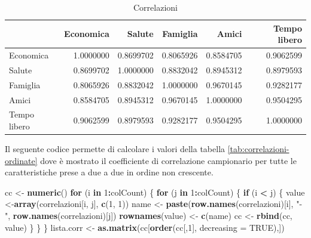 \documentclass[]{book}
\newenvironment{Shaded}{\begin{snugshade}}{\end{snugshade}}
\newcommand{\KeywordTok}[1]{\textcolor[rgb]{0.13,0.29,0.53}{\textbf{#1}}}
\newcommand{\DataTypeTok}[1]{\textcolor[rgb]{0.13,0.29,0.53}{#1}}
\newcommand{\DecValTok}[1]{\textcolor[rgb]{0.00,0.00,0.81}{#1}}
\newcommand{\StringTok}[1]{\textcolor[rgb]{0.31,0.60,0.02}{#1}}
\newcommand{\OtherTok}[1]{\textcolor[rgb]{0.56,0.35,0.01}{#1}}
\newcommand{\ControlFlowTok}[1]{\textcolor[rgb]{0.13,0.29,0.53}{\textbf{#1}}}
\newcommand{\OperatorTok}[1]{\textcolor[rgb]{0.81,0.36,0.00}{\textbf{#1}}}
\newcommand{\NormalTok}[1]{#1}
\begin{document}
\begin{table}

\caption{\label{tab:correlazioni}Correlazioni}
\centering
\begin{tabular}[t]{l|r|r|r|r|r}
\hline
  & Economica & Salute & Famiglia & Amici & Tempo libero\\
\hline
Economica & 1.0000000 & 0.8699702 & 0.8065926 & 0.8584705 & 0.9062599\\
\hline
Salute & 0.8699702 & 1.0000000 & 0.8832042 & 0.8945312 & 0.8979593\\
\hline
Famiglia & 0.8065926 & 0.8832042 & 1.0000000 & 0.9670145 & 0.9282177\\
\hline
Amici & 0.8584705 & 0.8945312 & 0.9670145 & 1.0000000 & 0.9504295\\
\hline
Tempo libero & 0.9062599 & 0.8979593 & 0.9282177 & 0.9504295 & 1.0000000\\
\hline
\end{tabular}
\end{table}

Il seguente codice permette di calcolare i valori della tabella
\ref{tab:correlazioni-ordinate} dove è mostrato il coefficiente di
correlazione campionario per tutte le caratteristiche prese a due a due
in ordine non crescente.

\begin{Shaded}
\begin{Highlighting}[]
\NormalTok{cc <-}\StringTok{ }\KeywordTok{numeric}\NormalTok{()}
\ControlFlowTok{for}\NormalTok{ (i }\ControlFlowTok{in} \DecValTok{1}\OperatorTok{:}\NormalTok{colCount) \{}
  \ControlFlowTok{for}\NormalTok{ (j }\ControlFlowTok{in} \DecValTok{1}\OperatorTok{:}\NormalTok{colCount) \{}
    \ControlFlowTok{if}\NormalTok{ (i }\OperatorTok{<}\StringTok{ }\NormalTok{j) \{}
\NormalTok{      value <-}\KeywordTok{array}\NormalTok{(correlazioni[i, j], }\KeywordTok{c}\NormalTok{(}\DecValTok{1}\NormalTok{, }\DecValTok{1}\NormalTok{))}
\NormalTok{      name <-}\StringTok{ }\KeywordTok{paste}\NormalTok{(}\KeywordTok{row.names}\NormalTok{(correlazioni)[i], }\StringTok{"-"}\NormalTok{,}
                    \KeywordTok{row.names}\NormalTok{(correlazioni)[j])}
      \KeywordTok{rownames}\NormalTok{(value) <-}\StringTok{ }\KeywordTok{c}\NormalTok{(name)}
\NormalTok{      cc <-}\StringTok{ }\KeywordTok{rbind}\NormalTok{(cc, value)}
\NormalTok{    \}}
\NormalTok{  \}}
\NormalTok{\}}
\NormalTok{lista.corr <-}\StringTok{ }\KeywordTok{as.matrix}\NormalTok{(cc[}\KeywordTok{order}\NormalTok{(cc[,}\DecValTok{1}\NormalTok{], }\DataTypeTok{decreasing =} \OtherTok{TRUE}\NormalTok{),])}
\end{Highlighting}
\end{Shaded}
\end{document}
